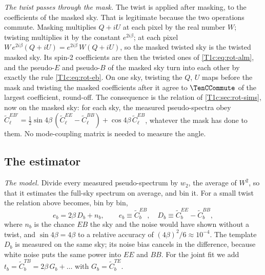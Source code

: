 \emph{The twist passes through the mask.} The twist is applied after masking, to the coefficients of the masked
sky. That is legitimate because the two operations commute. Masking multiplies $Q+iU$ at each pixel by the real
number $W$; twisting multiplies it by the constant $e^{2i\beta}$; at each pixel $W\,e^{2i\beta}(Q+iU)=e^{2i\beta}\,W(Q+iU)$, so
the masked twisted sky is the twisted masked sky. Its spin-2 coefficients are then the twisted ones of
\cref{T1c:eq:rot-alm}, and the pseudo-$E$ and pseudo-$B$ of the masked sky turn into each other by exactly the rule
\cref{T1c:eq:rot-eb}. On one sky, twisting the $Q$, $U$ maps before the mask and twisting the masked coefficients
after it agree to $\TenCCommute$ of the largest coefficient, round-off. The consequence is the relation of
\cref{T1c:sec:rot-sims}, now on the masked sky: for each sky, the measured pseudo-spectra obey
$\widetilde C^{EB\prime}_\ell=\frac12\sin4\beta\,(\widetilde C^{EE}_\ell-\widetilde C^{BB}_\ell)+\cos4\beta\,\widetilde C^{EB}_\ell$, whatever the mask has
done to them. No mode-coupling matrix is needed to measure the angle.

\subsection{The estimator}
\label{10c:sec:mc-estimator}

\emph{The model.} Divide every measured pseudo-spectrum by $w_2$, the average of $W^2$, so that it estimates the
full-sky spectrum on average, and bin it. For a small twist the relation above becomes, bin by bin,
\begin{equation}
  e_b=2\beta\,D_b+n_b,\qquad e_b\equiv\widetilde C^{EB}_b,\quad D_b\equiv\widetilde C^{EE}_b-\widetilde C^{BB}_b,
  \label{10c:eq:mc-model}
\end{equation}
where $n_b$ is the chance $EB$ the sky and the noise would have shown without a twist, and $\sin4\beta=4\beta$ to a
relative accuracy of $(4\beta)^2/6\approx10^{-4}$. The template $D_b$ is measured on the same sky; its noise bias
cancels in the difference, because white noise puts the same power into $EE$ and $BB$. For the joint fit we add
$t_b=\widetilde C^{TB}_b=2\beta\,G_b+\dots$ with $G_b=\widetilde C^{TE}_b$.

